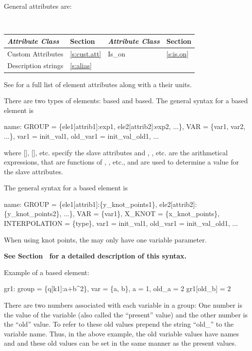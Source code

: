 General  attributes are:
\begin{center}
\tt
\begin{tabular}{llll} \toprule
  {\sl Attribute Class}      & Section           & {\sl Attribute Class}      & Section         \\ \midrule
  Custom Attributes          & \ref{s:cust.att}  & Is_on                      & \ref{s:is.on}   \\ 
  Description strings        & \ref{s:alias}     &                            &                 \\ 
  \bottomrule
\end{tabular}
\end{center}
\toffset
See  for a full list of element attributes along with a their units.

There are two types of  elements:  based and  based.
The general syntax for a  based  element is
\begin{example}
  name: GROUP = \{ele1[attrib1]:exp1, ele2[attrib2]:exp2, ...\}, 
              VAR = \{var1, var2, ...\}, var1 = init_val1, old_var1 = init_val_old1, ...
\end{example}
where [], [], etc. specify the slave attributes and
, , etc. are the arithmetical expressions, that are functions of ,
, etc., and are used to determine a value for the slave attributes.

The general syntax for a  based   element is
\begin{example}
  name: GROUP = \{ele1[attrib1]:\{y_knot_points1\}, ele2[attrib2]:\{y_knot_points2\}, ...\}, 
              VAR = \{var1\}, X_KNOT = \{x_knot_points\}, INTERPOLATION = \{type\}, 
              var1 = init_val1, old_var1 = init_val_old1, ...
\end{example}
When using knot points, the  may only have one variable parameter.

\textbf{See Section~ for a detailed description of this syntax.}

Example of a  based  element:
\begin{example}
  gr1: group = \{q[k1]:a+b^2\}, var = \{a, b\}, a = 1, old_a = 2
  gr1[old_b] = 2
\end{example}
There are two numbers associated with each variable in a group: One number is the value of the
variable (also called the ``present'' value) and the other number is the ``old'' value. To refer to
these old values prepend the string ``old_'' to the variable name. Thus, in the above example, the
old variable values have names  and  and these old values can be set in the same
manner as the present values.

